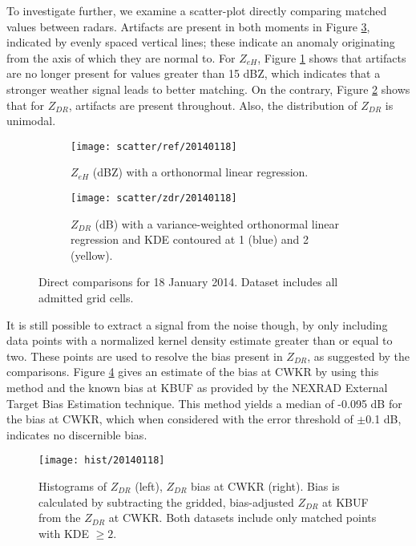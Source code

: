 To investigate further, we examine a scatter-plot directly comparing matched values between radars.
Artifacts are present in both moments in Figure
\ref{fig:scatter_20140118}, indicated by evenly spaced vertical lines; these indicate an anomaly
originating from the axis of which they are normal to. For
$Z_{eH}$, Figure \ref{fig:scatter_ref_20140118} shows that artifacts are no longer present for values
greater than 15 dBZ, which indicates that a
stronger weather signal leads to better matching. On the contrary, Figure \ref{fig:scatter_zdr_20140118}
shows that for $Z_{DR}$, artifacts are present throughout. Also, the distribution of $Z_{DR}$ is unimodal. 

\begin{figure}[H]
\centering
   \begin{subfigure}[t]{0.48\linewidth}
     \texttt{[image: scatter/ref/20140118]}
     \caption{$Z_{eH}$ (dBZ) with a orthonormal linear regression.}\label{fig:scatter_ref_20140118}
   \end{subfigure}
   \begin{subfigure}[t]{0.48\linewidth}
     \texttt{[image: scatter/zdr/20140118]}
     \caption{$Z_{DR}$ (dB) with a variance-weighted orthonormal linear regression and KDE contoured at 1 (blue) and 2 (yellow).}\label{fig:scatter_zdr_20140118}
   \end{subfigure}
\caption{Direct comparisons for 18 January 2014. Dataset includes all admitted grid cells.} \label{fig:scatter_20140118}
\end{figure}

It is still possible to extract a signal from the noise though, by only including data points with a
normalized kernel density estimate greater than or equal to two. These points are used to resolve the bias present in
$Z_{DR}$, as suggested by the comparisons. Figure \ref{fig:hist_20140118} gives an estimate of the
bias at CWKR by using this method and the known bias at KBUF as provided by the NEXRAD
External Target Bias Estimation technique. This method yields a median of -0.095 dB for the bias at CWKR, which when
considered with the error threshold of $\pm$0.1 dB, indicates no discernible bias.

\begin{figure}[H]
\texttt{[image: hist/20140118]}\centering
\caption{Histograms of $Z_{DR}$ (left), $Z_{DR}$ bias at CWKR (right). Bias is calculated by subtracting the gridded, bias-adjusted $Z_{DR}$ at KBUF from the
$Z_{DR}$ at CWKR. Both datasets include only matched points with KDE $\geq 2$. } 
\label{fig:hist_20140118}
\end{figure}



